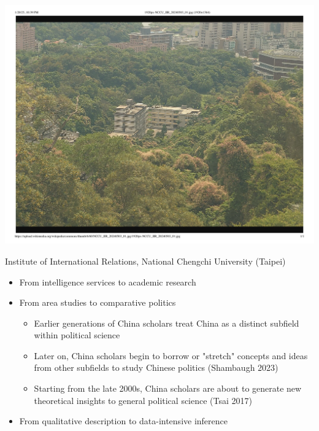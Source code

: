 \documentclass[
  10pt,
  ignorenonframetext,
]{beamer}
\begin{document}
\begin{frame}
\begin{center}\includegraphics[width=0.8\linewidth]{Figs/nccu} \end{center}
\vspace{0.3cm}
\begin{center}
\small
Institute of International Relations, National Chengchi University (Taipei)
\end{center}
\end{frame}

\begin{frame}
\begin{itemize}
  \item From intelligence services to academic research
  \vspace{0.3cm}
  \item From area studies to comparative politics
  \vspace{0.1cm}
  \begin{itemize}
    \item Earlier generations of China scholars treat China as a distinct subfield within political science
    \item Later on, China scholars begin to borrow or "stretch" concepts and ideas from other subfields to study Chinese politics (Shambaugh 2023)
    \item Starting from the late 2000s, China scholars are about to generate new theoretical insights to general political science (Tsai 2017)
  \end{itemize}
  \vspace{0.3cm}
  \item From qualitative description to data-intensive inference
\end{itemize}
\end{frame}
\end{document}
